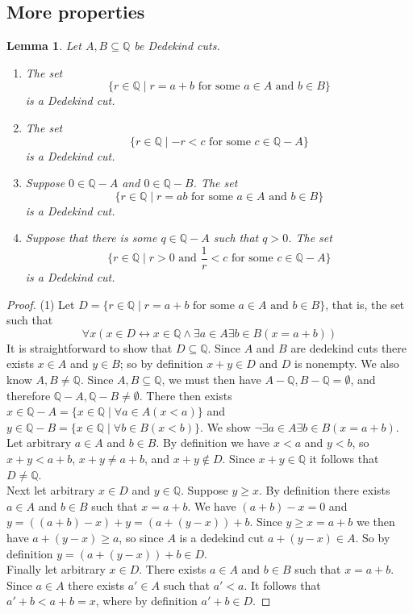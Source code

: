 \documentclass{report}
\newtheorem{lemma}[theo]{Lemma}
\begin{document}
\subsection{More properties}
\begin{lemma}\label{R_arithmetic_lemmas}
Let $A,B\subseteq\mathbb Q$ be Dedekind cuts.
\begin{enumerate}
\item The set
\begin{equation*}
\{r\in\mathbb Q\mid r=a+b\text{ for some }a\in A\text{ and }b\in B\}
\end{equation*}
is a Dedekind cut.
\item The set
\begin{equation*}
\{r\in\mathbb Q\mid-r<c\text{ for some }c\in\mathbb Q-A\}
\end{equation*}
is a Dedekind cut.
\item Suppose $0\in\mathbb Q-A$ and $0\in\mathbb Q-B$. The set
\begin{equation*}
\{r\in\mathbb Q\mid r=ab\text{ for some }a\in A\text{ and }b\in B\}
\end{equation*}
is a Dedekind cut.
\item Suppose that there is some $q\in\mathbb Q-A$ such that $q>0$. The set
\begin{equation*}
\{r\in\mathbb Q\mid r>0\text{ and }\frac{1}{r}<c\text{ for some }c\in\mathbb Q-A\}
\end{equation*}
is a Dedekind cut.
\end{enumerate}
\end{lemma}
\begin{proof}(1)
Let $D=\{r\in\mathbb Q\mid r=a+b\text{ for some }a\in A\text{ and }b\in B\}$, that is, the set such that
\begin{equation*}
\forall x(x\in D\leftrightarrow x\in\mathbb Q\land\exists a\in A\exists b\in B(x=a+b))
\end{equation*}
It is straightforward to show that $D\subseteq\mathbb Q$. Since $A$ and $B$ are dedekind cuts there exists $x\in A$ and $y\in B$; so by definition $x+y\in D$ and $D$ is nonempty. 
We also know $A,B\neq\mathbb Q$. Since $A,B\subseteq\mathbb Q$, we must then have $A-\mathbb Q,B-\mathbb Q=\emptyset$, and therefore $\mathbb Q-A,\mathbb Q-B\neq\emptyset$.
There then exists $x\in\mathbb Q-A=\{x\in\mathbb Q\mid\forall a\in A(x<a)\}$ and 
$y\in\mathbb Q-B=\{x\in\mathbb Q\mid\forall b\in B(x<b)\}$. We show 
$\neg\exists a\in A\exists b\in B(x=a+b)$. Let arbitrary $a\in A$ and $b\in B$. 
By definition we have $x<a$ and $y<b$, so $x+y<a+b$, $x+y\neq a+b$, and $x+y\notin D$. Since $x+y\in\mathbb Q$ it follows that $D\neq\mathbb Q$.\\
\indent Next let arbitrary $x\in D$ and $y\in\mathbb Q$. Suppose $y\geq x$. By definition there exists $a\in A$ and $b\in B$ such that $x=a+b$.
We have $(a+b)-x=0$ and $y=((a+b)-x)+y=(a+(y-x))+b$.
Since $y\geq x=a+b$ we then have $a+(y-x)\geq a$, so since $A$ is a dedekind cut $a+(y-x)\in A$.
So by definition $y=(a+(y-x))+b\in D$.\\
\indent Finally let arbitrary $x\in D$. There exists $a\in A$ and $b\in B$ such that $x=a+b$. Since $a\in A$ there exists $a'\in A$ such that $a'<a$. It follows that $a'+b<a+b=x$, where by 
definition $a'+b\in D$.
\end{proof}
\end{document}
